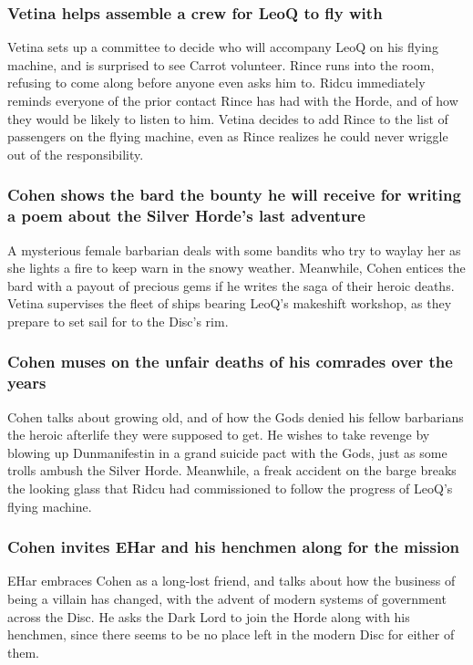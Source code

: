 \subsubsection{\Gls{Vetina} helps assemble a crew for \Gls{LeoQ} to fly with}
\Gls{Vetina} sets up a committee to decide who will accompany \Gls{LeoQ} on his flying machine, and
is surprised to see \Gls{Carrot} volunteer. \Gls{Rince} runs into the room, refusing to come along
before anyone even asks him to. \Gls{Ridcu} immediately reminds everyone of the prior contact
\Gls{Rince} has had with the Horde, and of how they would be likely to listen to him. \Gls{Vetina}
decides to add \Gls{Rince} to the list of passengers on the flying machine, even as \Gls{Rince}
realizes he could never wriggle out of the responsibility.

\subsubsection{\Gls{Cohen} shows the bard the bounty he will receive for writing a poem about the
    Silver Horde's last adventure}
A mysterious female barbarian deals with some bandits who try to waylay her as she lights a fire to
keep warn in the snowy weather. Meanwhile, \Gls{Cohen} entices the bard with a payout of precious
gems if he writes the saga of their heroic deaths. \Gls{Vetina} supervises the fleet of ships
bearing \Gls{LeoQ}'s makeshift workshop, as they prepare to set sail for to the Disc's rim.

\subsubsection{\Gls{Cohen} muses on the unfair deaths of his comrades over the years}
\Gls{Cohen} talks about growing old, and of how the Gods denied his fellow barbarians the heroic
afterlife they were supposed to get. He wishes to take revenge by blowing up Dunmanifestin in a
grand suicide pact with the Gods, just as some trolls ambush the Silver Horde. Meanwhile, a
freak accident on the barge breaks the looking glass that \Gls{Ridcu} had commissioned to follow
the progress of \Gls{LeoQ}'s flying machine.

\subsubsection{\Gls{Cohen} invites \Gls{EHar} and his henchmen along for the mission}
\Gls{EHar} embraces \Gls{Cohen} as a long-lost friend, and talks about how the business of being
a villain has changed, with the advent of modern systems of government across the Disc. He asks
the Dark Lord to join the Horde along with his henchmen, since there seems to be no place left in
the modern Disc for either of them.

